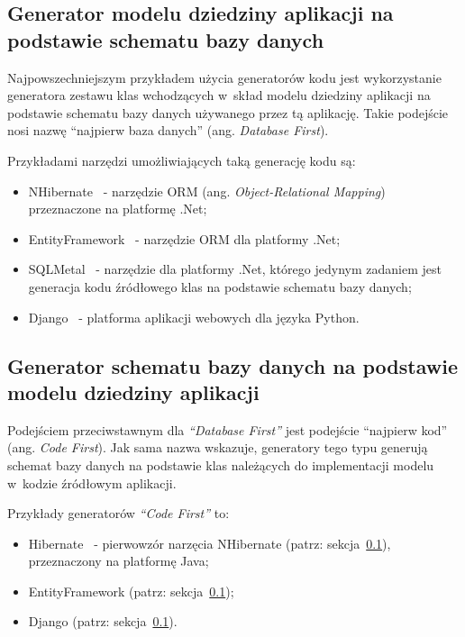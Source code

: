 \subsection{Generator modelu dziedziny aplikacji na podstawie schematu bazy danych} \label{sec:database_first}

Najpowszechniejszym przykładem użycia generatorów kodu jest wykorzystanie generatora zestawu klas wchodzących w~skład modelu dziedziny aplikacji na podstawie schematu bazy danych używanego przez tą aplikację.
Takie podejście nosi nazwę ``najpierw baza danych'' (ang. \emph{Database First}).

Przykładami narzędzi umożliwiających taką generację kodu są:

\begin{itemize}
 \item NHibernate~\cite{hibernate} - narzędzie ORM (ang. \emph{Object-Relational Mapping}) przeznaczone na platformę .Net;
 \item EntityFramework~\cite{entity_framework} - narzędzie ORM dla platformy .Net;
 \item SQLMetal~\cite{sqlmetal} - narzędzie dla platformy .Net, którego jedynym zadaniem jest generacja kodu źródłowego klas na podstawie schematu bazy danych;
 \item Django~\cite{django} - platforma aplikacji webowych dla języka Python.
\end{itemize}


\subsection{Generator schematu bazy danych na podstawie modelu dziedziny aplikacji}

Podejściem przeciwstawnym dla \emph{``Database First''} jest podejście ``najpierw kod'' (ang. \emph{Code First}).
Jak sama nazwa wskazuje, generatory tego typu generują schemat bazy danych na podstawie klas należących do implementacji modelu w~kodzie źródłowym aplikacji.

Przykłady generatorów \emph{``Code First''} to:

\begin{itemize}
 \item Hibernate~\cite{hibernate} - pierwowzór narzęcia NHibernate (patrz: sekcja~\ref{sec:database_first}), przeznaczony na platformę Java;
 \item EntityFramework (patrz: sekcja~\ref{sec:database_first});
 \item Django (patrz: sekcja~\ref{sec:database_first}).
\end{itemize}


